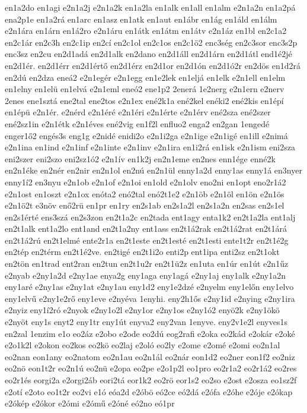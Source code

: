 {en1a2do
en1agi
e2n1a2j
e2n1a2k
en1a2la
en1alk
en1all
en1alm
e2n1a2n
en1a2pá
ena2p1e
en1a2rá
en1arc
en1asz
en1atk
en1aut
en1ábr
en1ág
en1áld
en1álm
e2n1ára
en1árn
en1á2ro
e2n1áru
en1átk
en1átm
en1átv
e2n1áz
en1bl
en2c1a2
en2c1ár
en2c3h
en2c1ip
en2cí
en2c1ol
en2c1os
en2c1ö2
enc3ség
en2c3sor
enc3s2p
enc3sz
en2cu
en2d1adá
en2d1alk
en2dano
en2d1áll
en2d1árn
en2d1átl
end1é2jé
en2d1ér.
en2d1érr
en2d1értő
en2d1érz
en2d1or
en2d1ón
en2d1ó2r
en2dös
en1d2rá
en2dú
en2dza
eneá2
e2n1egér
e2n1egg
en1e2lek
en1eljá
en1elk
e2n1ell
en1elm
en1elny
en1elü
en1elvá
e2n1eml
eneó2
ene1p2
2enerá
1e2nerg
e2n1ern
e2nerv
2enes
ene1sztá
ene2tal
ene2tos
e2n1ex
ené2k1a
ené2kel
enéki2
ené2kis
en1épí
en1épü
e2n1ér.
e2nérd
e2n1éré
e2n1éri
e2n1érte
e2n1érv
ené2sza
ené2szer
ené2sz1in
e2n1étk
e2n1éves
ené2vig
en1f2l
enfluo2
enga2
en2gan
1engedé
enger1ő2
engés3s
eng1g
e2nidé
enidi2o
e2n1i2ga
e2n1ige
e2n1igé
en1ill
e2nimá
e2n1ina
en1ind
e2n1inf
e2n1inte
e2n1inv
e2n1ira
en1i2rá
en1isk
e2n1ism
eni2sza
eni2szer
eni2szo
eni2sz1ó2
e2n1ív
en1k2j
en2n1eme
en2nes
enn1ége
enné2k
en2n1éke
en2nér
en2nir
en2n1ol
en2nú
en2n1ül
enny1a2d
enny1as
enny1á
en3nyer
enny1í2
en3nyu
e2n1ob
e2n1of
e2n1oi
en1old
e2n1olv
eno2ni
en1opt
eno2r1á2
e2n1ost
en1oszt
e2n1ox
enóta2
enó2tal
enó2t1e2
e2n1öb
e2n1öl
en1ön
e2n1ös
e2n1ö2t
e3növ
enő2rü
en1pr
en1ry
en2s1ab
en2s1a2l
en2s1a2n
en2sas
en2s1el
en2s1érté
ens3szá
en2s3zon
en2t1a2c
en2tada
ent1agy
enta1k2
en2t1a2la
ent1alj
en2t1alk
ent1a2lo
ent1and
en2t1a2ny
ent1ass
en2t1á2rak
en2t1á2rat
en2t1árá
en2t1á2rú
en2t1elmé
ente2r1a
en2t1este
en2t1esté
en2t1esti
ente1t2r
en2t1é2g
en2tép
en2térm
en2t1é2ve.
en2tigé
en2t1i2o
enti2p
ent1ipa
enti2sz
en2t1okt
en2tön
en1trad
ent2ran
en2tun
en2t1u2r
en2t1ü2z
en1uta
en1úr
en1út
e2n1űz
e2nyab
e2ny1a2d
e2ny1ae
enya2g
eny1aga
eny1agá
e2ny1aj
eny1alk
e2ny1a2n
eny1aré
e2ny1as
e2ny1at
e2ny1au
eny1d2
eny1e2dzé
e2nyelm
eny1előn
eny1elvo
eny1elvű
e2ny1e2rő
eny1eve
e2nyéva
1enyhi.
eny2h1ős
e2ny1id
e2nying
e2ny1ira
e2nyiz
eny1í2ró
e2nyok
e2ny1o2l
e2ny1or
e2ny1os
e2ny1ó2
enyö2k
e2ny1ökö
e2nyöt
eny1s
enyt2
eny1tr
eny1út
enyva2
eny2van
1enyve.
eny2v1e2l
enyves1s
en2zal
1enzim
e1o
eo2áz
e2obo
e2ode
eo2dú
eog2rafi
e2oka
eo2kád
e2okár
e2oké
e2o1k2l
e2okon
eo2kos
eo2kö
eo2laj
e2oló
eo2ly
e2ome
e2omé
e2omi
eo2n1al
eo2nan
eon1any
eo2natom
eo2n1au
eo2n1ál
eo2nár
eon1d2
eo2ner
eon1f2
eo2niz
eo2nö
eon1t2r
eo2n1ú
eo2nü
e2opa
eo2pe
e2o1p2l
eo1pro
eo2r1a2
eo2r1á2
eo2res
eo2r1és
eorgi2a
e2orgi2áb
eori2tá
eor1k2
eo2rö
eor1s2
eo2so
e2ost
e2osza
eo1sz2f
e2otí
e2oto
eo1t2r
eo2vi
e1ó
eóa2d
e2óbö
eó2ce
eó2dá
e2ófa
e2óhe
e2óje
e2ókap
e2ókép
e2ókor
e2ómi
e2ómű
e2óné
eó2no
eó1pr
}
